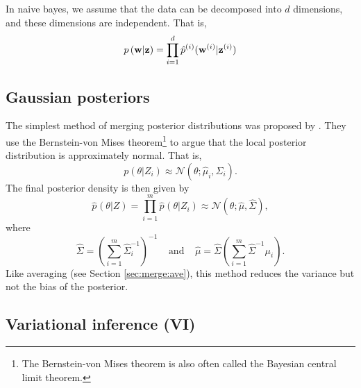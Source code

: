 \documentclass[thesis.tex]{subfiles}
\newcommand{\p}[1]{p\left({#1}\right)}
\newcommand{\psup}[2]{\hat p^{#1}({#2})}
\newcommand{\phat}[1]{\psup{}{#1}}
\newcommand{\gaussian}[3]{\mathcal N({#1};{#2},{#3})}
\begin{document}
In naive bayes, we assume that the data can be decomposed into $d$ dimensions,
and these dimensions are independent.
That is,
\begin{equation}
    \p{\w | \z} = \prod_{i=1}^d \psup{(i)}{\w^{(i)} | \z^{(i)}}
\end{equation}


\subsection{Gaussian posteriors}

The simplest method of merging posterior distributions was proposed by \cite{neiswanger2014asymptotically}.
They use the Bernstein-von Mises theorem\footnote{
    The Bernstein-von Mises theorem is also often called the Bayesian central limit theorem.
}
to argue that the local posterior distribution is approximately normal.
That is,
\begin{equation}
    \p{\theta | Z_i}
    \approx
    \gaussian{\theta}{\hat\mu_i}{\hat\Sigma_i}
    .
\end{equation}
The final posterior density is then given by
\begin{equation}
    \phat{\theta | Z}
    =
    \prod_{i=1}^m
    \phat{\theta | Z_i}
    \approx
    \gaussian{\theta}{\hat\mu}{\hat\Sigma}
    ,
\end{equation}
where
\begin{equation}
    \hat\Sigma
    =
    \left(
        \sum_{i=1}^m
        \hat\Sigma_i^{-1}
    \right)^{-1}
    ~~~~~\text{and}~~~~~
    \hat\mu
    =
    \hat\Sigma \left(\sum_{i=1}^m \hat\Sigma^{-1} \mu_i \right)
    .
\end{equation}
Like averaging (see Section \ref{sec:merge:ave}),
this method reduces the variance but not the bias of the posterior.


\subsection{Variational inference (VI)}
\label{sec:merge:vi}
\end{document}
